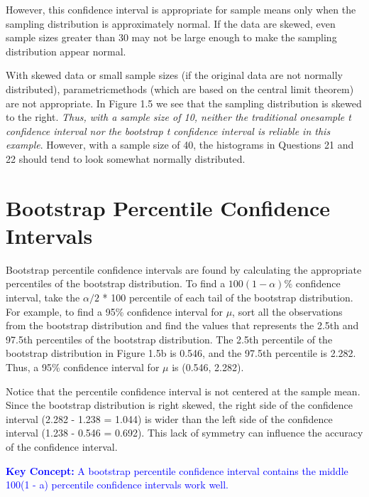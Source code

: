 \documentclass[
]{report}
\begin{document}
However, this confidence interval is appropriate for sample means only when the sampling distribution is approximately normal. If the data are skewed, even
sample sizes greater than 30 may not be large enough to make the sampling distribution appear normal.

With skewed data or small sample sizes (if the original data are not normally distributed), parametricmethods (which are based on the central limit theorem) are not appropriate. In Figure 1.5 we see that the sampling distribution is skewed to the right. \emph{Thus, with a sample size of 10, neither the traditional onesample
t confidence interval nor the bootstrap t confidence interval is reliable in this example}. However, with a sample size of 40, the histograms in Questions 21 and 22 should tend to look somewhat normally distributed.

\hypertarget{bootstrap-percentile-confidence-intervals}{%
\section*{Bootstrap Percentile Confidence Intervals}\label{bootstrap-percentile-confidence-intervals}}

Bootstrap percentile confidence intervals are found by calculating the appropriate percentiles of the bootstrap distribution. To find a \(100(1 - \alpha)\%\) confidence interval, take the \(\alpha/2\) * 100 percentile of each tail of the bootstrap distribution. For example, to find a 95\% confidence interval for \(\mu\), sort all the observations from the bootstrap distribution and find the values that represents the 2.5th and 97.5th percentiles of the bootstrap distribution. The 2.5th percentile of the bootstrap distribution in Figure 1.5b is 0.546, and the 97.5th percentile is 2.282. Thus, a 95\% confidence interval for \(\mu\) is (0.546, 2.282).

Notice that the percentile confidence interval is not centered at the sample mean. Since the bootstrap distribution is right skewed, the right side of the confidence interval (2.282 - 1.238 = 1.044) is wider than the left side of the confidence interval (1.238 - 0.546 = 0.692). This lack of symmetry can influence the accuracy of the confidence interval.

\textbf{\textcolor{blue}{Key Concept:}}
\textcolor{blue}{A bootstrap percentile confidence interval contains the middle 100(1 - a)%
percentile confidence intervals work well.}
\end{document}
